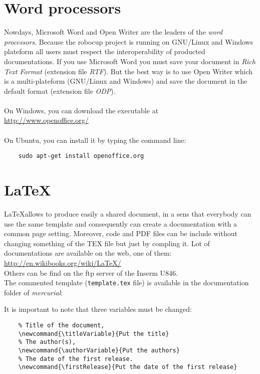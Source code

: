 \documentclass[a4paper, 12pt, oneside]{report}
\newcommand{\titleVariable}{Standards}
\newcommand{\authorVariable}{Tijn van Der Zaar \& Jean-David Boucher}
\newcommand{\firstRelease}{March 26, 2010}
\begin{document}

\section{Word processors \label{Word processors}}
Nowdays, Microsoft Word and Open Writer are the leaders of the \textit{word processors}. Because the robocup project is running on GNU/Linux and Windows plateform all users must respect the interoperability of producted documentations. If you use Microsoft Word you must save your document in \textit{Rich Text Format} (extension file \textit{RTF}). But the best way is to use Open Writer which is a multi-plateform (GNU/Linux and Windows) and save the document in the default format (extension file \textit{ODP}).\\
\\
On Windows, you can download the executable at \\
\url{http://www.openoffice.org/} \\
\\
On Ubuntu, you can install it by typing the command line:
\begin{verbatim}
	sudo apt-get install openoffice.org
\end{verbatim}


\section{\LaTeX \label{LaTeX}}
\LaTeX allows to produce easily a shared document, in a sens that everybody can use the same template and consequently can create a documentation with a common page setting. Moreover, code and PDF files can be include without changing something of the TEX file but just by compling it. Lot of documentations are available on the web, one of them: \\
\url{http://en.wikibooks.org/wiki/LaTeX/} \\
Others can be find on the ftp server of the Inserm U846.\\
The commented template (\texttt{template.tex} file) is available in the documentation folder of \textit{mercurial}:

It is important to note that three variables must be changed:
\begin{verbatim}
	% Title of the document,
	\newcommand{\titleVariable}{Put the title}
	% The author(s),
	\newcommand{\authorVariable}{Put the authors}
	% The date of the first release.
	\newcommand{\firstRelease}{Put the date of the first release}
\end{verbatim}
\end{document}
